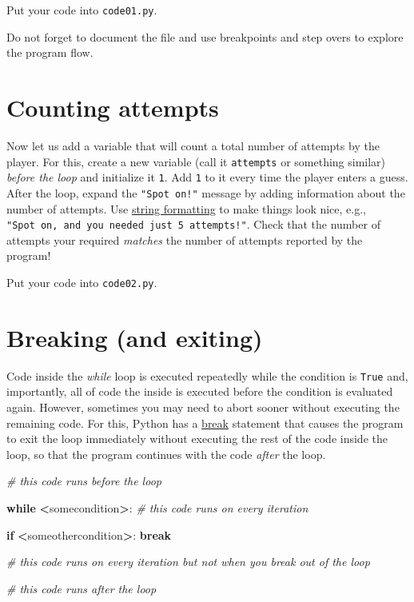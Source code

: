 \documentclass[
]{book}
\newenvironment{Shaded}{\begin{snugshade}}{\end{snugshade}}
\newcommand{\CommentTok}[1]{\textcolor[rgb]{0.56,0.35,0.01}{\textit{#1}}}
\newcommand{\ControlFlowTok}[1]{\textcolor[rgb]{0.13,0.29,0.53}{\textbf{#1}}}
\newcommand{\NormalTok}[1]{#1}
\newcommand{\OperatorTok}[1]{\textcolor[rgb]{0.81,0.36,0.00}{\textbf{#1}}}
\begin{document}
Put your code into \texttt{code01.py}.

Do not forget to document the file and use breakpoints and step overs to explore the program flow.

\hypertarget{counting-attempts}{%
\section{Counting attempts}\label{counting-attempts}}

Now let us add a variable that will count a total number of attempts by the player. For this, create a new variable (call it \texttt{attempts} or something similar) \emph{before the loop} and initialize it \texttt{1}. Add \texttt{1} to it every time the player enters a guess. After the loop, expand the \texttt{"Spot\ on!"} message by adding information about the number of attempts. Use \protect\hyperlink{ux5cux23string-formatting}{string formatting} to make things look nice, e.g., \texttt{"Spot\ on,\ and\ you\ needed\ just\ 5\ attempts!"}. Check that the number of attempts your required \emph{matches} the number of attempts reported by the program!

Put your code into \texttt{code02.py}.

\hypertarget{break}{%
\section{Breaking (and exiting)}\label{break}}

Code inside the \emph{while} loop is executed repeatedly while the condition is \texttt{True} and, importantly, all of code the inside is executed before the condition is evaluated again. However, sometimes you may need to abort sooner without executing the remaining code. For this, Python has a \href{https://docs.python.org/3/tutorial/controlflow.html\#break-and-continue-statements-and-else-clauses-on-loops}{break} statement that causes the program to exit the loop immediately without executing the rest of the code inside the loop, so that the program continues with the code \emph{after} the loop.

\begin{Shaded}
\begin{Highlighting}[]
\CommentTok{\# this code runs before the loop}

\ControlFlowTok{while} \OperatorTok{\textless{}}\NormalTok{somecondition}\OperatorTok{\textgreater{}}\NormalTok{:}
  \CommentTok{\# this code runs on every iteration}
  
    \ControlFlowTok{if} \OperatorTok{\textless{}}\NormalTok{someothercondition}\OperatorTok{\textgreater{}}\NormalTok{:}
        \ControlFlowTok{break}
  
  \CommentTok{\# this code runs on every iteration but not when you break out of the loop}

\CommentTok{\# this code runs after the loop}
\end{Highlighting}
\end{Shaded}
\end{document}
